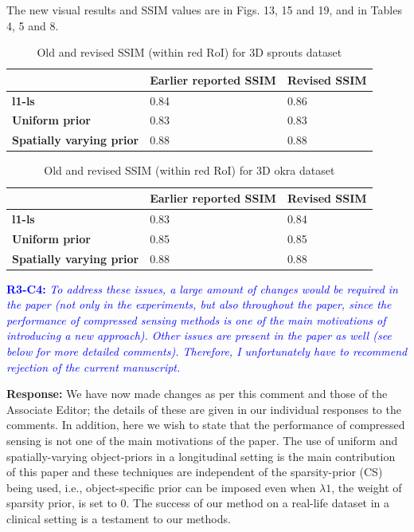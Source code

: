 \documentclass{article}
\begin{document}
The new visual results and SSIM values are in Figs. 13, 15 and 19, and in Tables 4, 5 and 8. 


\begin{table}[!h]
  \caption{Old and revised SSIM (within red RoI) for 3D sprouts dataset}
  \label{tab:sprouts_revised_ssim}
\begin{tabular}{|l|l|l|}
\hline
 & \textbf{Earlier reported SSIM} & \textbf{Revised SSIM} \\ \hline
\textbf{l1-ls} & 0.84 & 0.86 \\ \hline
\textbf{Uniform prior} & 0.83 & 0.83 \\ \hline
\textbf{Spatially varying prior} & 0.88 & 0.88 \\ \hline
\end{tabular}
\end{table}


\begin{table}[!h]
  \caption{Old and revised SSIM (within red RoI) for 3D okra dataset}
  \label{tab:okra_revised_ssim}
\begin{tabular}{|l|l|l|}
\hline
 & \textbf{Earlier reported SSIM} & \textbf{Revised SSIM} \\ \hline
\textbf{l1-ls} & 0.83 & 0.84 \\ \hline
\textbf{Uniform prior} & 0.85 & 0.85 \\ \hline
\textbf{Spatially varying prior} & 0.88 & 0.88 \\ \hline
\end{tabular}
\end{table}

\textcolor{blue}{\textbf{R3-C4:}\textit{ To address these issues, a large amount of changes would be required in the paper (not only in the experiments, but also throughout the paper, since the performance of compressed sensing methods is one of the main motivations of introducing a new approach). Other issues are present in the paper as well (see below for more detailed comments). Therefore, I unfortunately have to recommend rejection of the current manuscript.}}

\textbf{Response:} We have now made changes as per this comment and those of the Associate Editor; the details of these are given in our individual responses to the comments. In addition, here we wish to state that the performance of compressed sensing is not one of the main motivations of the paper. The use of uniform and spatially-varying object-priors in a longitudinal setting is the main contribution of this paper and these techniques are independent of the sparsity-prior (CS) being used, i.e., object-specific prior can be imposed even when $\lambda1$, the weight of sparsity prior, is set to $0$.  The success of our method on a real-life dataset in a clinical setting is a testament to our methods.\\
\end{document}

